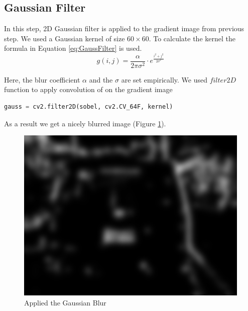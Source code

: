 \documentclass{standalone}
\begin{document}
\subsection{Gaussian Filter}
In this step, 2D Gaussian filter is applied to the gradient image from previous step. We used a Gaussian kernel of size $60 \times 60$. To calculate the kernel the formula in Equation \ref{eq:GaussFilter} is used.
\begin{equation} \label{eq:GaussFilter}
g(i, j) = \dfrac{\alpha}{2\pi\sigma^2} \cdot e^{\frac{i^2 + j^2}{2\sigma^2}}
\end{equation}

Here, the blur coefficient $\alpha$ and the $\sigma$ are set empirically. We used $filter2D$ function to apply convolution of on the gradient image
\begin{lstlisting}[language=Python]
gauss = cv2.filter2D(sobel, cv2.CV_64F, kernel)
\end{lstlisting}

As a result we get a nicely blurred image (Figure \ref{fig:GaussianSample}).
\begin{figure} 
	\centering
	\includegraphics[width=.8\linewidth]{./img/sample/stage3.jpg}
	\caption{Applied the Gaussian Blur} 
	\label{fig:GaussianSample}
\end{figure}
\end{document}
